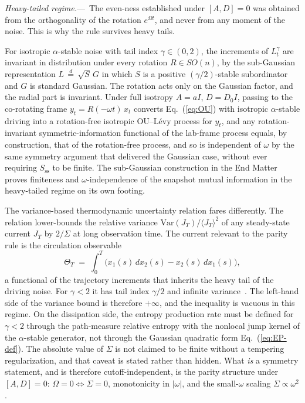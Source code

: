 \documentclass[%
 reprint,
 superscriptaddress,
 nofootinbib,
 nobibnotes,
 amsmath,amssymb,
 aps,
 prl,
 floatfix,
]{revtex4-2}
\newcommand{\Sss}{S_{\mathrm{ss}}}
\newcommand{\plsection}[1]{\par\medskip\noindent\textit{#1.}---\,\ignorespaces}
\begin{document}
\plsection{Heavy-tailed regime}%
The even-ness established under $[A,D]=0$ was obtained from the orthogonality of the rotation $e^{\Omega t}$, and never from any moment of the noise. This is why the rule survives heavy tails.

For isotropic $\alpha$-stable noise with tail index $\gamma \in (0, 2)$, the increments of $L^\gamma_t$ are invariant in distribution under every rotation $R \in SO(n)$, by the sub-Gaussian representation $L \,\stackrel{d}{=}\, \sqrt{S}\,G$ in which $S$ is a positive $(\gamma/2)$-stable subordinator and $G$ is standard Gaussian. The rotation acts only on the Gaussian factor, and the radial part is invariant. Under full isotropy $A = a I$, $D = D_0 I$, passing to the co-rotating frame $y_t = R(-\omega t)\,x_t$ converts Eq.~(\ref{eq:OU}) with isotropic $\alpha$-stable driving into a rotation-free isotropic OU--L\'evy process for $y_t$, and any rotation-invariant symmetric-information functional of the lab-frame process equals, by construction, that of the rotation-free process, and so is independent of $\omega$ by the same symmetry argument that delivered the Gaussian case, without ever requiring $\Sss$ to be finite. The sub-Gaussian construction in the End Matter proves finiteness and $\omega$-independence of the snapshot mutual information in the heavy-tailed regime on its own footing.

The variance-based thermodynamic uncertainty relation fares differently. The relation lower-bounds the relative variance $\mathrm{Var}(J_T)/\langle J_T\rangle^2$ of any steady-state current $J_T$ by $2/\Sigma$ at long observation time. The current relevant to the parity rule is the circulation observable
\begin{equation}\label{eq:Theta}
\Theta_T \;=\; \int_0^T \bigl(x_1(s)\,dx_2(s) - x_2(s)\,dx_1(s)\bigr),
\end{equation}
a functional of the trajectory increments that inherits the heavy tail of the driving noise. For $\gamma < 2$ it has tail index $\gamma/2$ and infinite variance~\cite{Spinney2016}. The left-hand side of the variance bound is therefore $+\infty$, and the inequality is vacuous in this regime. On the dissipation side, the entropy production rate must be defined for $\gamma < 2$ through the path-measure relative entropy with the nonlocal jump kernel of the $\alpha$-stable generator, not through the Gaussian quadratic form Eq.~(\ref{eq:EP-def}). The absolute value of $\Sigma$ is not claimed to be finite without a tempering regularization, and that caveat is stated rather than hidden. What \emph{is} a symmetry statement, and is therefore cutoff-independent, is the parity structure under $[A,D] = 0$: $\Omega = 0 \Leftrightarrow \Sigma = 0$, monotonicity in $|\omega|$, and the small-$\omega$ scaling $\Sigma \propto \omega^2$.
\end{document}
